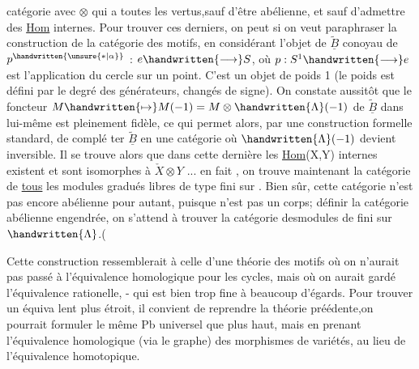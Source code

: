 
catégorie avec $\otimes$ qui a toutes les vertus,sauf d'être abélienne, et
sauf d'admettre des \uline{Hom} internes. Pour trouver ces derniers, on peut
si on veut paraphraser la construction de la catégorie des motifs, en
 considérant l'objet  de $\tilde{\underline{B}}$ conoyau de
$p^{\handwritten{\unsure{*|\alpha}}}$ : $e \handwritten{\longrightarrow} S$, où $p:S^{1} \handwritten{\longrightarrow} e$ est l'application du cercle sur un
point. C'est un objet de poids 1 (le poids est défini par le degré 
des générateurs, changés de signe). On constate aussitôt que le
foncteur $M\handwritten{\mapsto} M(-1)=M\otimes\handwritten{\Lambda}(-1)$ de $\tilde{\underline{B}}$ dans lui-même est pleinement fidèle,
ce qui permet alors, par une construction formelle standard, de complé%
ter $\tilde{\underline{B}}$ en une catégorie où $\handwritten{\Lambda}(-1)$ devient inversible. Il se trouve
alors que dans cette dernière les \uline{Hom}(X,Y) internes existent et
 sont isomorphes à $\check{X}\otimes Y$ ... en fait , on trouve maintenant la
catégorie de \uline{tous} les modules gradués libres de type fini sur \quad .
Bien sûr, cette catégorie n'est pas encore abélienne pour autant,
puisque \quad n'est pas un corps;   définir la catégorie abélienne
engendrée, on s'attend à trouver la catégorie \handwritten{/}des\handwritten{/}modules de   fini
sur $\handwritten{\Lambda}$.(  
 

Cette construction ressemblerait à celle d'une théorie des
motifs où on n'aurait pas passé à l'équivalence homologique pour
les cycles, mais où on aurait gardé l'équivalence rationelle, - qui
est bien trop fine à beaucoup d'égards. Pour trouver un équiva%
lent plus étroit, il convient de reprendre la théorie préédente,on
pourrait formuler le même Pb universel que plus haut, mais en prenant
l'équivalence homologique (via le graphe) des morphismes de variétés,
au lieu de l'équivalence homotopique. 

